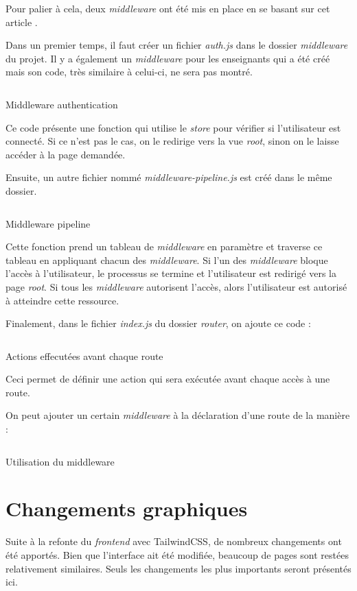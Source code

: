 Pour palier à cela, deux \emph{middleware} ont été mis en place en se basant sur cet article \cite{middlewareVuejs}.

Dans un premier temps, il faut créer un fichier \emph{auth.js} dans le dossier \emph{middleware} du projet. Il y a également un \emph{middleware} pour les enseignants qui a été créé mais son code, très similaire à celui-ci, ne sera pas montré.

\begin{listing}[H]
    \inputminted{js}{assets/code/auth.js}
    \caption{Middleware authentication}
\end{listing}
Ce code présente une fonction qui utilise le \emph{store} pour vérifier si l'utilisateur est connecté. Si ce n'est pas le cas, on le redirige vers la vue \emph{root}, sinon on le laisse accéder à la page demandée.

Ensuite, un autre fichier nommé \emph{middleware-pipeline.js} est créé dans le même dossier.
\begin{listing}[H]
    \inputminted{js}{assets/code/middlewarePipeline.js}
    \caption{Middleware pipeline}
\end{listing}

Cette fonction prend un tableau de \emph{middleware} en paramètre et traverse ce tableau en appliquant chacun des \emph{middleware}. Si l'un des \emph{middleware} bloque l'accès à l'utilisateur, le processus se termine et l'utilisateur est redirigé vers la page \emph{root}. Si tous les \emph{middleware} autorisent l'accès, alors l'utilisateur est autorisé à atteindre cette ressource.


Finalement, dans le fichier \emph{index.js} du dossier \emph{router}, on ajoute ce code :

\begin{listing}[H]
    \inputminted{js}{assets/code/beforeEachRoute.js}
    \caption{Actions effecutées avant chaque route}
\end{listing}

Ceci permet de définir une action qui sera exécutée avant chaque accès à une route.

On peut ajouter un certain \emph{middleware} à la déclaration d'une route de la manière :

\begin{listing}[H]
    \inputminted{js}{assets/code/route.js}
    \caption{Utilisation du middleware}
\end{listing}


\section{Changements graphiques}
Suite à la refonte du \emph{frontend} avec TailwindCSS, de nombreux changements ont été apportés. Bien que l'interface ait été modifiée, beaucoup de pages sont restées relativement similaires. Seuls les changements les plus importants seront présentés ici.

